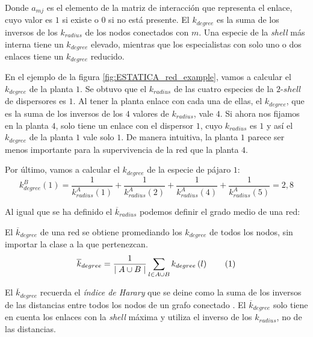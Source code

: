 Donde $a_{mj}$ es el elemento de la matriz de interacción que representa el enlace, cuyo valor es $1$ si existe o $0$ si no está presente. El $k_{degree}$ es la suma de los inversos de los $k_{radius}$ de los nodos conectados con $m$. Una especie de la \textit{shell} más interna tiene un $k_{degree}$ elevado,  mientras que los especialistas con solo uno o dos enlaces tiene un $k_{degree}$ reducido. 

En el ejemplo de la figura \ref{fig:ESTATICA_red_example}, vamos a calcular el $k_{degree}$ de la planta $1$. Se obtuvo que el $k_{radius}$ de las cuatro especies de la $2$-$shell$ de dispersores es $1$. Al tener la planta enlace con cada una de ellas, el $k_{degree}$, que es la suma de los inversos de los $4$ valores de $k_{radius}$, vale $4$. Si ahora nos fijamos en la planta $4$, solo tiene un enlace con el dispersor $1$, cuyo $k_{radius}$ es $1$ y así el $k_{degree}$ de la planta $1$ vale solo $1$. De manera intuitiva, la planta $1$ parece ser menos importante para la supervivencia de la red que la planta $4$. 

Por último, vamos a calcular el $k_{degree}$ de la especie de pájaro $1$:
\begin{equation}
k^B_{degree}\left(1\right) = \frac{1}{k^A_{radius}\left(1\right)} + \frac{1}{k^A_{radius}\left(2\right)} + \frac{1}{k^A_{radius}\left(4\right)} + \frac{1}{k^A_{radius}\left(5\right)} = 2,8
\label{example_kdegree}
\end{equation}

Al igual que se ha definido el $\overline k_{radius}$ podemos definir el grado medio de una red:
\begin{theo} 
El \textit{$\overline k_{degree}$} de una red se obtiene promediando los ${k}_{degree}$ de todos los nodos, sin importar la clase a la que pertenezcan.
\begin{align*}
\displaystyle
\overline {k}_{degree} = \frac{1}{\mid A \cup B \mid}\sum\limits_{l \in A \cup B} k_{degree}\left(l\right)
\stepcounter{equation}\tag{\theequation}\label{avgkdegree}
\end{align*}
\label{ESTATICA_avgkdegree}
\end{theo}

El  $\overline k_{degree}$ recuerda el \textit{índice de Harary} que se deine como la suma de los inversos de las distancias entre todos los nodos de un grafo conectado \cite{plavvsic1993harary}. El  $\overline k_{degree}$ solo tiene en cuenta los enlaces con la \textit{shell} máxima y utiliza el inverso de los $k_{radius}$, no de las distancias.

